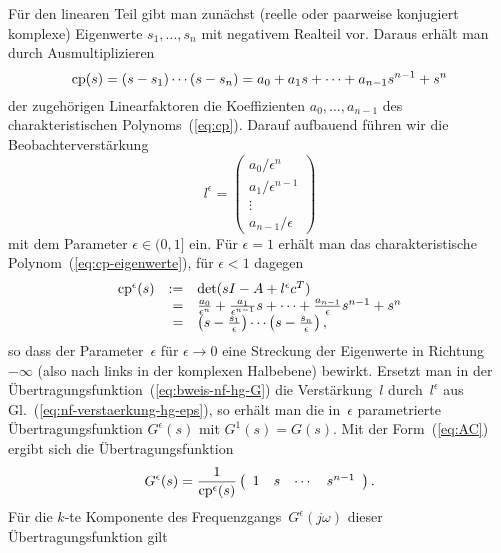 \begin{svmultproof2}
Für den linearen Teil gibt man zunächst (reelle oder paarweise konjugiert
komplexe) Eigen\-werte $s_{1},\ldots,s_{n}$ mit negativem Realteil
vor. Daraus erhält man durch Ausmultiplizieren 
\begin{equation}
{\operatorname{cp}}(s)=(s-s_{1})\cdots(s-s_{n})=a_{0}+a_{1}s+\cdots+a_{n-1}s^{n-1}+s^{n}\label{eq:cp-eigenwerte}
\end{equation}
der zugehörigen Linearfaktoren die Koeffizienten $a_{0},\ldots,a_{n-1}$
des charakteristischen Polynoms~(\ref{eq:cp}). Darauf aufbauend
führen wir die Beobachterverstärkung 
\begin{equation}
l^{\epsilon}=\left(\begin{array}{c}
a_{0}/\epsilon^{n}\\
a_{1}/\epsilon^{n-1}\\
\vdots\\
a_{n-1}/\epsilon
\end{array}\right)\label{eq:nf-verstaerkung-hg-eps}
\end{equation}
mit dem Parameter $\epsilon\in(0,1]$ ein. Für $\epsilon=1$ erhält
man das charakteristische Polynom~(\ref{eq:cp-eigenwerte}), für
$\epsilon<1$ dagegen
\[
\begin{array}{lrl}
{\operatorname{cp}}^{\epsilon}(s) & := & \det(sI-A+l^{\epsilon}c^{T})\\
 & = & \frac{a_{0}}{\epsilon^{n}}+\frac{a_{1}}{\epsilon^{n-1}}s+\cdots+\frac{a_{n-1}}{\epsilon}s^{n-1}+s^{n}\\
 & = & \left(s-\frac{s_{1}}{\epsilon}\right)\cdots\left(s-\frac{s_{n}}{\epsilon}\right),
\end{array}
\]
so dass der Parameter~$\epsilon$ für $\epsilon\to0$ eine Streckung
der Eigenwerte in Richtung~$-\infty$ (also nach links in der komplexen
Halbebene) bewirkt. Ersetzt man in der Übertragungsfunktion~(\ref{eq:bweis-nf-hg-G})
die Verstärkung~$l$ durch~$l^{\epsilon}$ aus Gl.~(\ref{eq:nf-verstaerkung-hg-eps}),
so erhält man die in~$\epsilon$ parametrierte Übertragungsfunktion
$G^{\epsilon}(s)$ mit $G^{1}(s)=G(s)$. Mit der Form~(\ref{eq:AC})
ergibt sich die Übertragungsfunktion
\begin{equation}
G^{\epsilon}(s)=\frac{1}{{\operatorname{cp}}^{\epsilon}(s)}\left(\begin{array}{cccc}
1 & s & \cdots & s^{n-1}\end{array}\right).\label{eq:bweis-nf-hg-G-eps}
\end{equation}
Für die $k$-te Komponente des Frequenzgangs~$G^{\epsilon}(j\omega)$
dieser Übertragungsfunktion gilt
\[
\begin{array}{ccl}

\end{array}\]
\end{svmultproof2}
